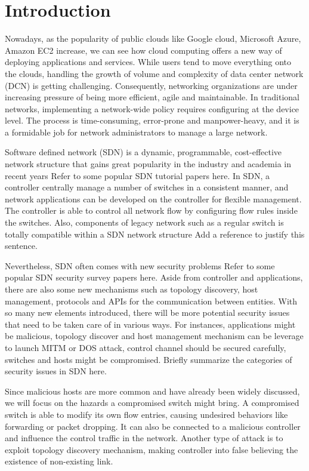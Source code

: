 \chapter{Introduction}
\label{chap:intro}
\setcounter{page}{1}

Nowadays, as the popularity of public clouds like Google cloud, Microsoft Azure, Amazon EC2 increase, we can see how cloud computing offers a new way of deploying applications and services. While users tend to move everything onto the clouds, handling the growth of volume and complexity of data center network (DCN) is getting challenging. Consequently, networking organizations are under increasing pressure of being more efficient, agile and maintainable. In traditional networks, implementing a network-wide policy requires configuring at the device level. The process is time-consuming, error-prone and manpower-heavy, and it is a formidable job for network administrators to manage a large network.

Software defined network (SDN) is a dynamic, programmable, cost-effective network structure that gains great popularity in the industry and academia in recent years \cite{KRVRAU15, MABPPRST08, LHM10}{\color{red} Refer to some popular SDN tutorial papers here}. In SDN, a controller centrally manage a number of switches in a consistent manner, and network applications can be developed on the controller for flexible management. The controller is able to control all network flow by configuring flow rules inside the switches. Also, components of legacy network such as a regular switch is totally compatible within a SDN network structure {\color{red} Add a reference to justify this sentence}.

Nevertheless, SDN often comes with new security problems \cite{SOS13, CM}{\color{red} Refer to some popular SDN security survey papers here}. Aside from controller and applications, there are also some new mechanisms such as topology discovery, host management, protocols and APIs for the communication between entities. With so many new elements introduced, there will be more potential security issues that need to be taken care of in various ways. For instances, applications might be malicious, topology discover and host management mechanism can be leverage to launch MITM or DOS attack, control channel should be secured carefully, switches and hosts might be compromised. {\color{red} Briefly summarize the categories of security issues in SDN here.}

Since malicious hosts are more common and have already been widely discussed, we will focus on the hazards a compromised switch might bring. A compromised switch is able to modify its own flow entries, causing undesired behaviors like forwarding or packet dropping. It can also be connected to a malicious controller and influence the control traffic in the network. Another type of attack is to exploit topology discovery mechanism, making controller into false believing the existence of non-existing link. 

